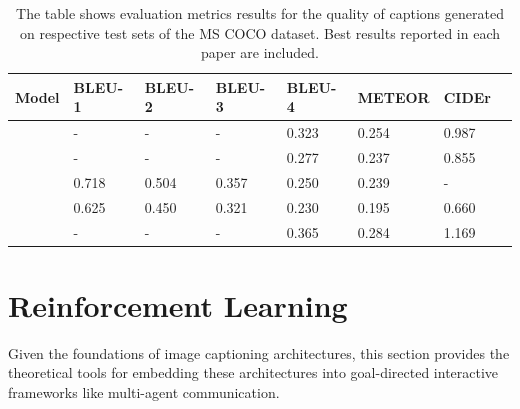 \begin{table}[]
	\begin{tabularx}{\textwidth}{|X|l|l|l|l|l|l|l|}
		\hline
		Model                               & BLEU-1 & BLEU-2 & BLEU-3 & BLEU-4 & METEOR & CIDEr \\ \hline
		\cite{bengio2015scheduled}        & -      & -      & -      & 0.323   & 0.254  & 0.987 \\ \hline
		\cite{vinyals2015show}  & -      & -      & -      & 0.277    & 0.237  & 0.855 \\ \hline
		\cite{xu2015show} & 0.718  & 0.504  & 0.357  & 0.250     & 0.239  & -     \\ \hline
		\cite{karpathy2015deep}          & 0.625  & 0.450  & 0.321  & 0.230   & 0.195  & 0.660 \\ \hline
		\cite{zhou2019unified}          & -  & -  & -  & 0.365   & 0.284  & 1.169  \\ \hline
	\end{tabularx}
\caption{\label{tab_coco_metrics_ref}The table shows evaluation metrics results for the quality of captions generated on respective test sets of the MS COCO dataset. Best results reported in each paper are included.}
\end{table}

\section{Reinforcement Learning}
\label{rl}

Given the foundations of image captioning architectures, this section provides the theoretical tools for embedding these architectures into goal-directed interactive frameworks like multi-agent communication.

